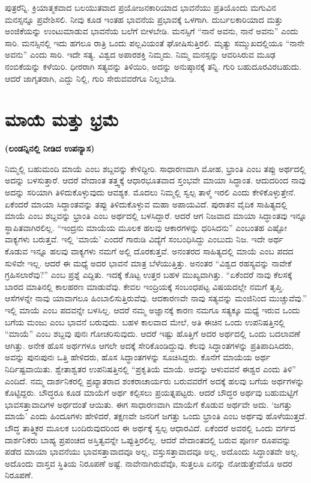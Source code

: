 ಪುತ್ರರೆನ್ನಿ. ಕ್ರಿಯಾತ್ಮಕವಾದ ಬಲಯುತವಾದ ಪ್ರಯೋಜನಕಾರಿಯಾದ ಭಾವನೆಯು ಪ್ರತಿಯೊಂದು ಮಗುವಿನ ಮನಸ್ಸನ್ನೂ ಪ್ರವೇಶಿಸಲಿ. ನೀವು ಕೂಡ ಇಂತಹ ಭಾವನೆಯ ಪ್ರಭಾವಕ್ಕೆ ಒಳಗಾಗಿ. ದುರ್ಬಲಕಾರಿಯಾದ ಮತ್ತು ಅಂಜಿಕೆಯನ್ನು ಉಂಟುಮಾಡುವ ಭಾವನೆಯ ಬಲೆಗೆ ಬೀಳಬೇಡಿ. ಮನಸ್ಸಿಗೆ “ನಾನೆ ಅವನು, ನಾನೆ ಅವನು” ಎಂದು ಸಾರಿ. ಮನಸ್ಸಿನಲ್ಲಿ ಇದು ಹಗಲೂ ರಾತ್ರಿ ಒಂದು ಪಲ್ಲವಿಯಂತೆ ಘೋಷಿಸುತ್ತಿರಲಿ. ಮೃತ್ಯು ಸಮ್ಮುಖದಲ್ಲಿಯೂ “ನಾನೇ ಅವನು” ಎಂದು ಸಾರಿ. ಇದೇ ಸತ್ಯ. ವಿಶ್ವದ ಅಪಾರಶಕ್ತಿ ನಿಮ್ಮದು. ನಿಮ್ಮ ಮನಸ್ಸನ್ನು ಆವರಿಸಿರುವ ಮೂಢ ನಂಬಿಕೆಯನ್ನು ಕಳೆಯಿರಿ. ಧೀರರಾಗಿ ಸತ್ಯವನ್ನು ತಿಳಿಯಿರಿ, ಅದನ್ನು ಅನುಷ್ಠಾನಕ್ಕೆ ತನ್ನಿ. ಗುರಿ ಬಹುದೂರವಿರಬಹುದು. ಆದರೆ ಜಾಗೃತರಾಗಿ, ಎದ್ದು ನಿಲ್ಲಿ, ಗುರಿ ಸೇರುವವರೆಗೂ ನಿಲ್ಲಬೇಡಿ.

\chapter{ಮಾಯೆ ಮತ್ತು ಭ್ರಮೆ}%

\centerline{\textbf{(ಲಂಡನ್ನಿನಲ್ಲಿ ನೀಡಿದ ಉಪನ್ಯಾಸ)}}

ನಿಮ್ಮಲ್ಲಿ ಬಹುಮಂದಿ ಮಾಯೆ ಎಂಬ ಶಬ್ದವನ್ನು ಕೇಳಿದ್ದೀರಿ. ಸಾಧಾರಣವಾಗಿ ಮೋಹ, ಭ್ರಾಂತಿ ಎಂಬ ತಪ್ಪು ಅರ್ಥದಲ್ಲಿ ಅದನ್ನು ಬಳಸುತ್ತಾರೆ. ಆದರೆ ವೇದಾಂತ ತತ್ತ್ವಕ್ಕೆ ಆಧಾರಭೂತವಾದ ಸ್ತಂಭವೇ ಮಾಯಾ ಸಿದ್ಧಾಂತ. ಆದುದರಿಂದ ನಾವು ಅದನ್ನು ಸರಿಯಾಗಿ ತಿಳಿದುಕೊಳ್ಳುವುದು ಆವಶ್ಯಕ. ಮೊದಲು ನಿಮ್ಮಲ್ಲಿ ಸ್ವಲ್ಪ ತಾಳ್ಮೆ ಇರಲಿ ಎಂದು ಕೇಳಿಕೊಳ್ಳುತ್ತೇನೆ. ಏಕೆಂದರೆ ಮಾಯಾ ಸಿದ್ಧಾಂತವನ್ನು ತಪ್ಪು ತಿಳಿದುಕೊಳ್ಳುವ ಮಹಾ ಅಪಾಯವಿದೆ. ಪುರಾತನ ವೈದಿಕ ಸಾಹಿತ್ಯದಲ್ಲಿ ಮಾಯೆ ಎಂಬ ಶಬ್ದವನ್ನು ಭ್ರಾಂತಿ ಎಂಬ ಅರ್ಥದಲ್ಲಿ ಬಳಸಿದ್ದಾರೆ. ಆದರೆ ಆಗ ನಿಜವಾದ ಮಾಯಾ ಸಿದ್ಧಾಂತವು ಇನ್ನೂ ಸ್ಥಾಪಿತವಾಗಿರಲಿಲ್ಲ. “ಇಂದ್ರನು ಮಾಯೆಯ ಮೂಲಕ ಹಲವು ಆಕಾರಗಳನ್ನು ಧರಿಸಿದನು” ಎಂಬಂತಹ ಎಷ್ಟೋ ವಾಕ್ಯಗಳು ಬರುತ್ತವೆ. ಇಲ್ಲಿ ‘ಮಾಯೆ’ ಎಂದರೆ ಗಾರುಡಿ ವಿದ್ಯೆಗೆ ಸಂಬಂಧಿಸಿದ್ದು ಎಂಬುದು ನಿಜ. ಇದೇ ಅರ್ಥ ಕೊಡುವ ಇನ್ನೂ ಹಲವು ವಾಕ್ಯಗಳು ನಮಗೆ ಅಲ್ಲಿ ದೊರಕುತ್ತವೆ. ಅನಂತರದ ಸಾಹಿತ್ಯದಲ್ಲಿ ಮಾಯೆ ಎಂಬ ಪದದ ಸುಳಿವೇ ಇಲ್ಲ. ಆದರೆ ಈ ಮಧ್ಯೆ ಅದರ ಭಾವನೆ ಮಾತ್ರ ಬೆಳೆಯುತ್ತಿತ್ತು. ಅನಂತರ “ವಿಶ್ವದ ರಹಸ್ಯವನ್ನು ನಾವೇಕೆ ಗ್ರಹಿಸಲಾರೆವು?” ಎಂಬ ಪ್ರಶ್ನೆ ಎದ್ದಿತು. ಇದಕ್ಕೆ ಕೊಟ್ಟ ಉತ್ತರ ಬಹಳ ಮುಖ್ಯವಾಗಿತ್ತು. “ಏಕೆಂದರೆ ನಾವು ಕೆಲಸಕ್ಕೆ ಬಾರದ ಮಾತಿನಲ್ಲಿ ಕಾಲಹರಣ ಮಾಡುವೆವು. ಕೇವಲ ಇಂದ್ರಿಯಕ್ಕೆ ಸಂಬಂಧಪಟ್ಟ ವಿಷಯದಲ್ಲೇ ನಮಗೆ ತೃಪ್ತಿ. ಆಸೆಗಳನ್ನೇ ನಾವು ಯಾವಾಗಲೂ ಹಿಂಬಾಲಿಸುತ್ತಿರುವೆವು. ಆದಕಾರಣವೇ ನಾವು ಸತ್ಯವನ್ನು ಮಂಜಿನಿಂದ ಮುಚ್ಚುವೆವು.” ಇಲ್ಲಿ ಮಾಯೆ ಎಂಬ ಪದವನ್ನೇ ಬಳಸಿಲ್ಲ. ಆದರೆ ನಮ್ಮ ಅಜ್ಞಾನಕ್ಕೆ ಕಾರಣ ನಮಗೂ ಸತ್ಯಕ್ಕೂ ಮಧ್ಯೆ ಇರುವ ಒಂದು ಬಗೆಯ ಮಂಜು ಎಂಬ ಭಾವನೆ ಬರುವುದು. ಬಹಳ ಕಾಲವಾದ ಮೇಲೆ, ಅತಿ ಈಚಿನ ಒಂದು ಉಪನಿಷತ್ತಿನಲ್ಲಿ “ಮಾಯೆ” ಎಂಬ ಶಬ್ದವು ಪುನಃ ಗೋಚರಿಸುವುದು. ಆದರೆ ಇಷ್ಟು ಹೊತ್ತಿಗೆ ಅದರ ಅರ್ಥದಲ್ಲಿ ಒಂದು ಬದಲಾವಣೆ ಆಗಿತ್ತು. ಅನೇಕ ಹೊಸ ಅರ್ಥಗಳೂ ಆಗಲೇ ಅದಕ್ಕೆ ಸೇರಿಕೊಂಡಿದ್ದುವು. ಕೆಲವು ಸಿದ್ಧಾಂತಗಳನ್ನು ಪ್ರತಿಪಾದಿಸಿದರು, ಅವನ್ನು ಪುನಃಪುನಃ ಒತ್ತಿ ಹೇಳಿದರು, ಹೊಸ ಸಿದ್ಧಾಂತಗಳನ್ನು ಸೂಚಿಸಿದ್ದರು. ಕೊನೆಗೆ ಮಾಯೆಯ ಅರ್ಥ ನಿರ್ದಿಷ್ಟವಾಯಿತು. ಶ್ವೇತಾಶ್ವತರ ಉಪನಿಷತ್ತಿನಲ್ಲಿ “ಪ್ರಕೃತಿಯೆ ಮಾಯೆ. ಅದನ್ನು ಆಳುವವನೆ ಈಶ್ವರ ಎಂದು ತಿಳಿ” ಎಂದಿದೆ. ನಮ್ಮ ದಾರ್ಶನಿಕರಲ್ಲಿ ಪ್ರಖ್ಯಾತರಾದ ಶಂಕರಾಚಾರ್ಯರು ಬರುವವರೆಗೆ ಅದಕ್ಕೆ ಹಲವು ಬಗೆಯ ಅರ್ಥಗಳನ್ನು ಕೊಟ್ಟಿದ್ದರು. ಬೌದ್ಧರೂ ಕೂಡ ಮಾಯೆಗೆ ಅರ್ಥ ಕಲ್ಪಿಸಲು ಪ್ರಯತ್ನಪಟ್ಟರು. ಆದರೆ ಬೌದ್ಧರ ಅರ್ಥವು ಬಹುಮಟ್ಟಿಗೆ ಭಾವಸತ್ತಾವಾದಿಗಳ ಅರ್ಥದಂತೆ ಆಯಿತು. ಈಗ ಸಾಧಾರಣವಾಗಿ ಮಾಯೆಗೆ ಕೊಡುವ ಅರ್ಥವೇ ಅದು. ‘ಜಗತ್ತು ಮಾಯೆ’ ಎಂದು ಹಿಂದೂಗಳು ಹೇಳಿದರೆ, ತಕ್ಷಣವೇ ಜನರಿಗೆ ಜಗತ್ತು ಒಂದು ಭ್ರಾಂತಿ ಎಂಬ ಅರ್ಥವು ಹೊಳೆಯುತ್ತದೆ. ಬೌದ್ಧ ತಾತ್ತ್ವಿಕರ ಮೂಲಕ ಬಂದಿರುವುದರಿಂದ ಈ ಅರ್ಥಕ್ಕೆ ಸ್ವಲ್ಪ ಆಧಾರವಿದೆ. ಏಕೆಂದರೆ ಅವರಲ್ಲಿ ಒಂದು ವರ್ಗದ ದಾರ್ಶನಿಕರು ಬಾಹ್ಯ ಪ್ರಪಂಚದ ಅಸ್ತಿತ್ವವನ್ನೇ ಒಪ್ಪುತ್ತಿರಲಿಲ್ಲ. ಆದರೆ ವೇದಾಂತದಲ್ಲಿ ಬರುವ ಪೂರ್ಣ ರೂಪವನ್ನು ಪಡೆದ ಮಾಯಾ ಭಾವನೆಯು ಭಾವಸತ್ತಾವಾದವೂ ಅಲ್ಲ, ವಸ್ತುಸತ್ತಾವಾದವೂ ಅಲ್ಲ, ಅದೊಂದು ಸಿದ್ಧಾಂತವೇ ಅಲ್ಲ. ಅದೊಂದು ವಾಸ್ತವ ಸ್ಥಿತಿಯ ನಿರೂಪಣೆ ಅಷ್ಟೆ. ನಾವೇನಾಗಿರುವೆವೊ, ಸುತ್ತಲೂ ಏನನ್ನು ನೋಡುತ್ತೇವೆಯೊ ಅದರ ನಿರೂಪಣೆ.

